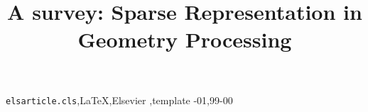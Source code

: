 \documentclass[3p,twocolumn]{elsarticle}
\begin{document}
\begin{frontmatter}

\title{A survey: Sparse Representation in Geometry Processing}
%
%
%
%

\begin{abstract}
\end{abstract}

\begin{keyword}
\texttt{elsarticle.cls}\sep \LaTeX\sep Elsevier \sep template
-01\sep  99-00
\end{keyword}

\end{frontmatter}

\linenumbers

%









\end{document}
